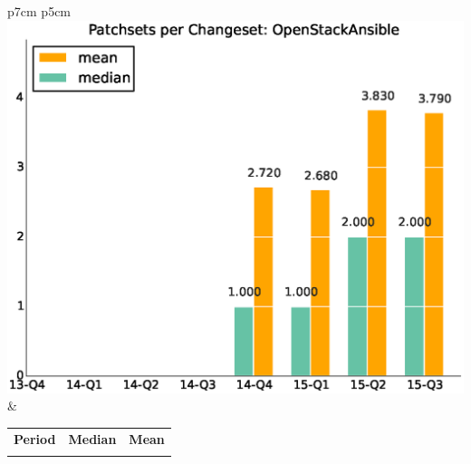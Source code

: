\documentclass[a4wide,11pt]{article}
\begin{document}
\begin{tabular}{p{7cm} p{5cm}}
    \vspace{0pt} 
    \includegraphics[scale=.35]{figs/patchsets_avgOpenStackAnsible.eps}
    & 
    \vspace{0pt}
    \begin{tabular}{l|r|r|}%
    \bfseries Period & \bfseries Median & \bfseries Mean %
    \csvreader[head to column names]{data/scr_patchsets_iterationsOpenStackAnsible.csv}{}%
    {\\ & \medianpatchsets & \meanpatchsets}
    \end{tabular}
\end{tabular}
\end{document}
